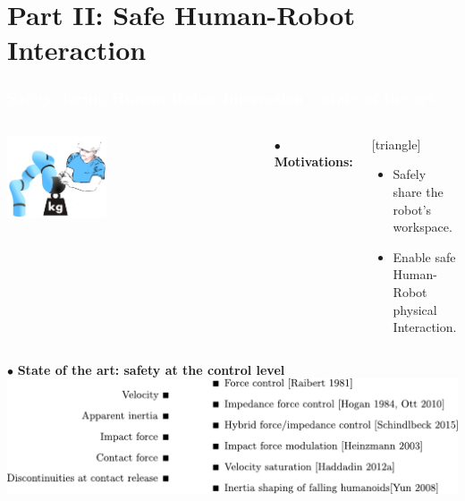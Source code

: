 \section{Part II: Safe Human-Robot Interaction}
\begin{frame}
  \frametitle{{\textcolor{white}{\hspace{0.3cm}Safety during Human-Robot Interaction -- state of the art}}}
  
 \vspace{-3mm} 
\begin{columns}
\column{.47\paperwidth}
\vspace{-5mm}
\begin{center}
\vspace{2mm}
\includegraphics[width=0.4\textwidth ]{figures/Human_robot_int.png}
\end{center}
 \vspace{-3mm} 
\column{.47\paperwidth}
$\bullet$ \textbf{Motivations:}                     
\begin{center}
[triangle]                        
\begin{itemize}
\item Safely share the robot's workspace.
\item Enable safe Human-Robot physical Interaction.
\end{itemize}                                            
\end{center}
\end{columns}

\vspace{7mm}
\hspace{-4mm}
$\bullet$ \textbf{State of the art: safety at the control level}
\vspace{6mm}
\includegraphics[width=1.0\textwidth]{figures/sttt0.pdf}
\vspace{-1mm}






\end{frame}














